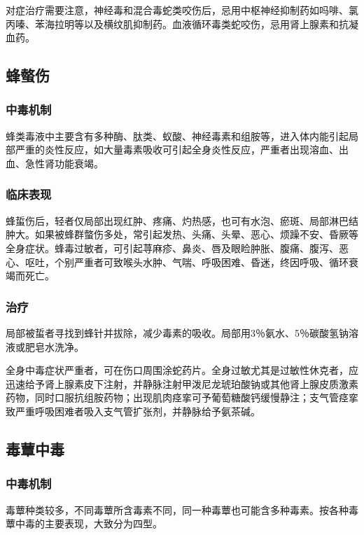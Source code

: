对症治疗需要注意，神经毒和混合毒蛇类咬伤后，忌用中枢神经抑制药如吗啡、氯丙嗪、苯海拉明等以及横纹肌抑制药。血液循环毒类蛇咬伤，忌用肾上腺素和抗凝血药。

\subsection{蜂螫伤}

\subsubsection{中毒机制}

蜂类毒液中主要含有多种酶、肽类、蚁酸、神经毒素和组胺等，进入体内能引起局部严重的炎性反应，如大量毒素吸收可引起全身炎性反应，严重者出现溶血、出血、急性肾功能衰竭。

\subsubsection{临床表现}

蜂蜇伤后，轻者仅局部出现红肿、疼痛、灼热感，也可有水泡、瘀斑、局部淋巴结肿大。如果被蜂群螫伤多处，常引起发热、头痛、头晕、恶心、烦躁不安、昏厥等全身症状。蜂毒过敏者，可引起荨麻疹、鼻炎、唇及眼睑肿胀、腹痛、腹泻、恶心、呕吐，个别严重者可致喉头水肿、气喘、呼吸困难、昏迷，终因呼吸、循环衰竭而死亡。

\subsubsection{治疗}

局部被蜇者寻找到蜂针并拔除，减少毒素的吸收。局部用3％氨水、5％碳酸氢钠溶液或肥皂水洗净。

全身中毒症状严重者，可在伤口周围涂蛇药片。全身过敏尤其是过敏性休克者，应迅速给予肾上腺素皮下注射，并静脉注射甲泼尼龙琥珀酸钠或其他肾上腺皮质激素药物，同时口服抗组胺药物；出现肌肉痉挛可予葡萄糖酸钙缓慢静注；支气管痉挛致严重呼吸困难者吸入支气管扩张剂，并静脉给予氨茶碱。

\subsection{毒蕈中毒}

\subsubsection{中毒机制}

毒蕈种类较多，不同毒蕈所含毒素不同，同一种毒蕈也可能含多种毒素。按各种毒蕈中毒的主要表现，大致分为四型。

